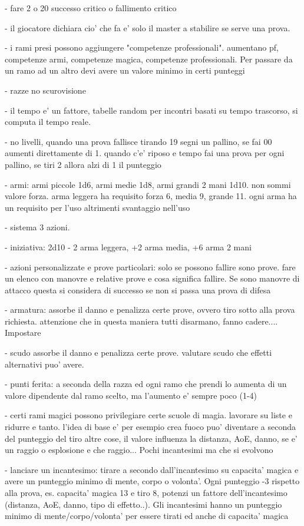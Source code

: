 \documentclass[12pt,a4paper,twoside,openany,twocolumn]{book}
\begin{document}
- fare 2 o 20  successo critico o fallimento  critico

- il giocatore dichiara cio' che fa e' solo il master a stabilire se serve una prova. 

- i rami presi possono aggiungere "competenze professionali". aumentano pf, competenze armi, competenze magica, competenze professionali. Per passare da un ramo ad un altro devi avere un valore minimo in certi punteggi

- razze no scurovisione

- il tempo e' un fattore, tabelle random per incontri basati su tempo trascorso, si computa il tempo reale.

- no livelli, quando una prova fallisce tirando 19 segni un pallino, se fai 00 aumenti direttamente di 1. quando c'e' riposo e tempo fai una prova per ogni pallino, se tiri 2 allora alzi di 1 il punteggio

- armi: armi piccole 1d6, armi medie 1d8, armi grandi 2 mani 1d10. non sommi valore forza. arma leggera ha requisito forza 6, media 9, grande 11. ogni arma ha un requisito per l'uso altrimenti svantaggio nell'uso

- sistema 3 azioni.

- iniziativa: 2d10 - 2 arma leggera, +2 arma media, +6 arma 2 mani

- azioni personalizzate e prove particolari: solo se possono fallire sono prove. fare un elenco con manovre e relative prove e cosa significa fallire. Se sono manovre di attacco questa si considera di successo se non si passa una prova di difesa

- armatura: assorbe il danno e penalizza certe prove, ovvero tiro sotto alla prova richiesta. attenzione che in questa maniera tutti disarmano, fanno cadere.... Impostare 

- scudo assorbe il danno e penalizza certe prove. valutare scudo che effetti alternativi puo' avere.

- punti ferita: a seconda della razza ed ogni ramo che prendi lo aumenta di un valore dipendente dal ramo scelto, ma l'aumento e' sempre poco (1-4)

- certi rami magici possono privilegiare certe scuole di magia. lavorare su liste e ridurre e tanto. l'idea di base e' per esempio crea fuoco puo' diventare a seconda del punteggio del tiro altre cose, il valore influenza la distanza, AoE, danno, se e' un raggio o esplosione e che raggio...  Pochi incantesimi ma che si evolvono

- lanciare un incantesimo: tirare a secondo dall'incantesimo su capacita' magica e avere un punteggio minimo di  mente, corpo o volonta'.  Ogni punteggio -3 rispetto alla prova, es. capacita' magica 13 e tiro 8, potenzi un fattore dell'incantesimo (distanza, AoE, danno, tipo di effetto..). Gli incantesimi hanno un punteggio minimo di mente/corpo/volonta' per essere tirati ed anche di capacita' magica
\end{document}
